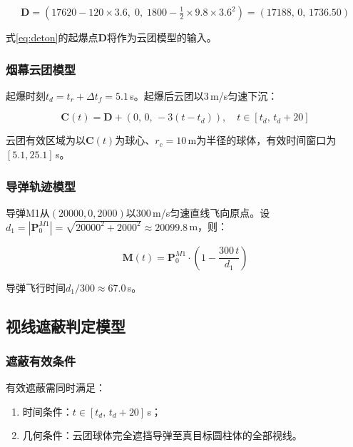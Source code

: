 \documentclass[a4paper]{ctexart}
\newcommand{\bm}[1]{\boldsymbol{#1}}
\begin{document}
\begin{equation}
\bm{D} = \left(17620 - 120 \times 3.6,\; 0,\; 1800 - \tfrac{1}{2} \times 9.8 \times 3.6^2\right) = (17188,\, 0,\, 1736.50)
\label{eq:deton}
\end{equation}

式\eqref{eq:deton}的起爆点$\bm{D}$将作为云团模型的输入。

\subsubsection{烟幕云团模型}

起爆时刻$t_d = t_r + \Delta t_f = 5.1$\,s。起爆后云团以3\,m/s匀速下沉：

\begin{equation}
\bm{C}(t) = \bm{D} + \left(0,\, 0,\, -3(t - t_d)\right), \quad t \in [t_d,\, t_d + 20]
\label{eq:cloud}
\end{equation}

云团有效区域为以$\bm{C}(t)$为球心、$r_c = 10$\,m为半径的球体，有效时间窗口为$[5.1, 25.1]$\,s。

\subsubsection{导弹轨迹模型}

导弹M1从$(20000, 0, 2000)$以300\,m/s匀速直线飞向原点。设$d_1 = |\bm{P}_0^{M1}| = \sqrt{20000^2 + 2000^2} \approx 20099.8$\,m，则：

\begin{equation}
\bm{M}(t) = \bm{P}_0^{M1} \cdot \left(1 - \frac{300\,t}{d_1}\right)
\label{eq:missile}
\end{equation}

导弹飞行时间$d_1/300 \approx 67.0$\,s。

\subsection{视线遮蔽判定模型}

\subsubsection{遮蔽有效条件}

有效遮蔽需同时满足：
\begin{enumerate}[label=（\arabic*）]
  \item 时间条件：$t \in [t_d,\, t_d + 20]$\,s；
  \item 几何条件：云团球体完全遮挡导弹至真目标圆柱体的全部视线。
\end{enumerate}
\end{document}
